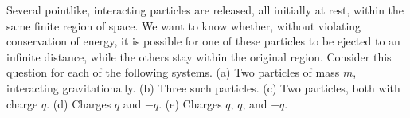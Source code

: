 Several pointlike, interacting particles are released, all initially at rest, within the same
finite region of space. We want to know whether, without violating conservation
of energy, it is possible for one of these particles to be ejected to an infinite
distance, while the others stay within the original region. Consider this question
for each of the following systems.
(a) Two particles of mass $m$, interacting gravitationally. (b) Three such
particles. (c) Two particles, both with charge $q$. (d) Charges $q$ and $-q$.
(e) Charges $q$, $q$, and $-q$.
